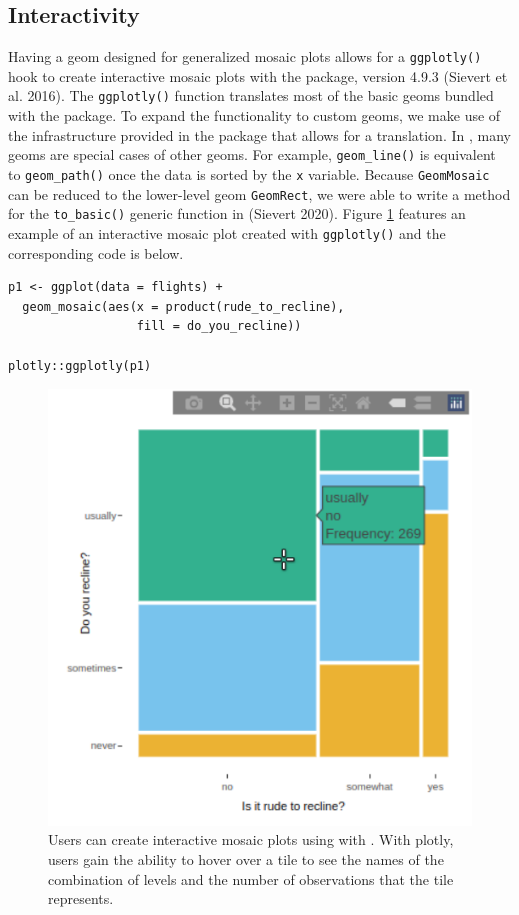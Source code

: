 \hypertarget{interactivity}{%
\subsection{Interactivity}\label{interactivity}}

Having a geom designed for generalized mosaic plots allows for a \texttt{ggplotly()} hook to create interactive mosaic plots with the  package, version 4.9.3 (Sievert et al. 2016). The \texttt{ggplotly()} function translates most of the basic geoms bundled with the  package. To expand the functionality to custom geoms, we make use of the infrastructure provided in the  package that allows for a translation. In , many geoms are special cases of other geoms. For example, \texttt{geom\_line()} is equivalent to \texttt{geom\_path()} once the data is sorted by the \texttt{x} variable. Because \texttt{GeomMosaic} can be reduced to the lower-level geom \texttt{GeomRect}, we were able to write a method for the \texttt{to\_basic()} generic function in  (Sievert 2020). Figure \ref{fig:plotly-static} features an example of an interactive mosaic plot created with \texttt{ggplotly()} and the corresponding code is below.

\begin{verbatim}
p1 <- ggplot(data = flights) +
  geom_mosaic(aes(x = product(rude_to_recline), 
                  fill = do_you_recline)) 

plotly::ggplotly(p1)
\end{verbatim}

\begin{figure}

{\centering \includegraphics[width=0.6\linewidth]{plotly} 

}

\caption{Users can create interactive mosaic plots using   with . With plotly, users gain the ability to hover over a tile to see the names of the combination of levels and the number of observations that the tile represents.}\label{fig:plotly-static}
\end{figure}

